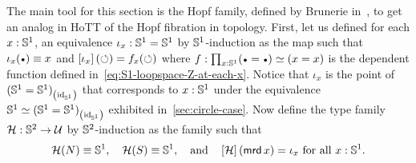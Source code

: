 \documentclass[english,a4]{article}
\renewcommand{\ap}[1]{\left[{#1}\right]}
\begin{document}
The main tool for this section is the Hopf family, defined by Brunerie
in~\cite{brunerie:thesis}, to get an analog in HoTT of the Hopf
fibration in topology. First, let us defined for each $x:{{\mathbb S^{1}}}$, an
equivalence $\iota_x: {{\mathbb S^{1}}}={{\mathbb S^{1}}}$ by ${{\mathbb S^{1}}}$-induction as the map such
that $\iota_x(\base) \jdeq x$ and $\ap{\iota_x}(\Sloop) = f_x(\Sloop)$
where $f\from \prod_{x\from\Sc} (\base=\base) \weq (x=x)$ is the
dependent function defined
in~\cref{eq:S1-loopspace-Z-at-each-x}. Notice that $\iota_x$ is the
point of ${({{\mathbb S^{1}}}={{\mathbb S^{1}}})}_{\left(\mathord{\mathrm{id}}_{{\mathbb S^{1}}}\right)}$ that corresponds to $x:{{\mathbb S^{1}}}$
under the equivalence ${{\mathbb S^{1}}} \simeq {({{\mathbb S^{1}}}={{\mathbb S^{1}}})}_{\left(\mathord{\mathrm{id}}_{{\mathbb S^{1}}}\right)}$
exhibited in~\cref{sec:circle-case}. Now define the type family
${\mathcal H}: {{\mathbb S^{2}}} \to \mathcal{U}$ by ${{\mathbb S^{2}}}$-induction as the family such that
\begin{displaymath}
  \hopf(N) \jdeq \Sc,\quad
  \hopf(S) \jdeq \Sc,\quad\text{and}\quad
  \ap\hopf (\mrd x) = \iota_x\ \text{for all}\ x:\Sc.
\end{displaymath}
\end{document}

